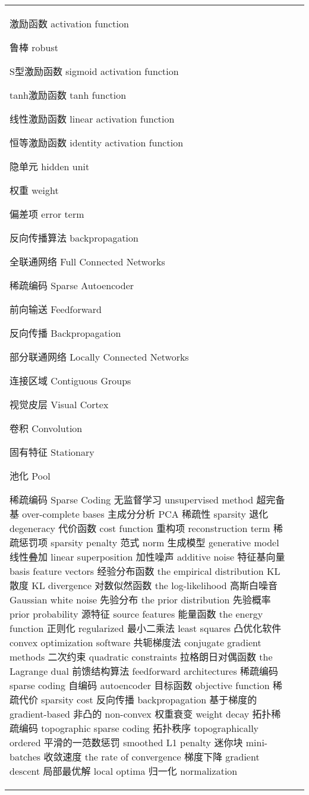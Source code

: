 \begin{longtable}[h]{m{}m{}}
激励函数 activation function 

鲁棒 robust 

S型激励函数 sigmoid activation function 

tanh激励函数 tanh function 

线性激励函数 linear activation function 

恒等激励函数 identity activation function 

隐单元 hidden unit 

权重 weight 

偏差项 error term 

反向传播算法 backpropagation


全联通网络 Full Connected Networks 

稀疏编码 Sparse Autoencoder 

前向输送 Feedforward 

反向传播 Backpropagation 

部分联通网络 Locally Connected Networks 

连接区域 Contiguous Groups 

视觉皮层 Visual Cortex 

卷积 Convolution 

固有特征 Stationary 

池化 Pool 

    稀疏编码 Sparse Coding 
    无监督学习 unsupervised method 
    超完备基 over-complete bases 
    主成分分析 PCA 
    稀疏性 sparsity 
    退化 degeneracy 
    代价函数 cost function 
    重构项 reconstruction term 
    稀疏惩罚项 sparsity penalty 
    范式 norm 
    生成模型 generative model 
    线性叠加 linear superposition 
    加性噪声 additive noise 
    特征基向量 basis feature vectors 
    经验分布函数 the empirical distribution 
    KL 散度 KL divergence 
    对数似然函数 the log-likelihood 
    高斯白噪音 Gaussian white noise 
    先验分布 the prior distribution 
    先验概率 prior probability 
    源特征 source features 
    能量函数 the energy function 
    正则化 regularized 
    最小二乘法 least squares 
    凸优化软件convex optimization software 
    共轭梯度法 conjugate gradient methods 
    二次约束 quadratic constraints 
    拉格朗日对偶函数 the Lagrange dual 
    前馈结构算法 feedforward architectures 
    稀疏编码 sparse coding 
    自编码 autoencoder 
    目标函数 objective function 
    稀疏代价 sparsity cost 
    反向传播 backpropagation 
    基于梯度的 gradient-based 
    非凸的 non-convex 
    权重衰变 weight decay 
    拓扑稀疏编码 topographic sparse coding 
    拓扑秩序 topographically ordered 
    平滑的一范数惩罚 smoothed L1 penalty 
    迷你块 mini-batches 
    收敛速度 the rate of convergence 
    梯度下降 gradient descent 
    局部最优解 local optima
    归一化 normalization 


\end{longtable}
